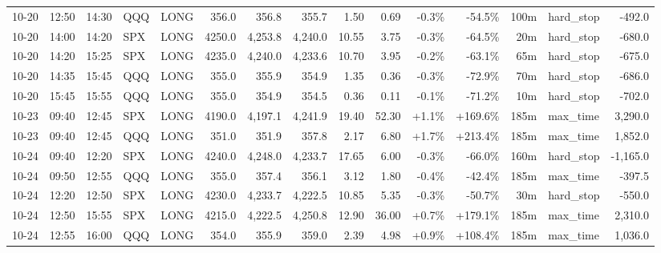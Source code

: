 \documentclass[11pt,a4paper,twoside]{article}
\begin{document}
\begin{landscape}
\begin{center}
\begin{longtable}{>{\color{txtmain}}l l l l l r r r r r r r r >{\color{txtmain}}l r}
10-20 & 12:50 & 14:30 & QQQ & LONG & 356.0 & 356.8 & 355.7 & 1.50 & 0.69 & \textcolor{lossred}{-0.3\%} & \textcolor{lossred}{-54.5\%} & 100m & hard\_stop & \textcolor{lossred}{-492.0} \\
10-20 & 14:00 & 14:20 & SPX & LONG & 4250.0 & 4,253.8 & 4,240.0 & 10.55 & 3.75 & \textcolor{lossred}{-0.3\%} & \textcolor{lossred}{-64.5\%} & 20m & hard\_stop & \textcolor{lossred}{-680.0} \\
10-20 & 14:20 & 15:25 & SPX & LONG & 4235.0 & 4,240.0 & 4,233.6 & 10.70 & 3.95 & \textcolor{lossred}{-0.2\%} & \textcolor{lossred}{-63.1\%} & 65m & hard\_stop & \textcolor{lossred}{-675.0} \\
10-20 & 14:35 & 15:45 & QQQ & LONG & 355.0 & 355.9 & 354.9 & 1.35 & 0.36 & \textcolor{lossred}{-0.3\%} & \textcolor{lossred}{-72.9\%} & 70m & hard\_stop & \textcolor{lossred}{-686.0} \\
10-20 & 15:45 & 15:55 & QQQ & LONG & 355.0 & 354.9 & 354.5 & 0.36 & 0.11 & \textcolor{lossred}{-0.1\%} & \textcolor{lossred}{-71.2\%} & 10m & hard\_stop & \textcolor{lossred}{-702.0} \\
10-23 & 09:40 & 12:45 & SPX & LONG & 4190.0 & 4,197.1 & 4,241.9 & 19.40 & 52.30 & \textcolor{wingreen}{+1.1\%} & \textcolor{wingreen}{+169.6\%} & 185m & max\_time & \textcolor{wingreen}{3,290.0} \\
10-23 & 09:40 & 12:45 & QQQ & LONG & 351.0 & 351.9 & 357.8 & 2.17 & 6.80 & \textcolor{wingreen}{+1.7\%} & \textcolor{wingreen}{+213.4\%} & 185m & max\_time & \textcolor{wingreen}{1,852.0} \\
10-24 & 09:40 & 12:20 & SPX & LONG & 4240.0 & 4,248.0 & 4,233.7 & 17.65 & 6.00 & \textcolor{lossred}{-0.3\%} & \textcolor{lossred}{-66.0\%} & 160m & hard\_stop & \textcolor{lossred}{-1,165.0} \\
10-24 & 09:50 & 12:55 & QQQ & LONG & 355.0 & 357.4 & 356.1 & 3.12 & 1.80 & \textcolor{lossred}{-0.4\%} & \textcolor{lossred}{-42.4\%} & 185m & max\_time & \textcolor{lossred}{-397.5} \\
10-24 & 12:20 & 12:50 & SPX & LONG & 4230.0 & 4,233.7 & 4,222.5 & 10.85 & 5.35 & \textcolor{lossred}{-0.3\%} & \textcolor{lossred}{-50.7\%} & 30m & hard\_stop & \textcolor{lossred}{-550.0} \\
10-24 & 12:50 & 15:55 & SPX & LONG & 4215.0 & 4,222.5 & 4,250.8 & 12.90 & 36.00 & \textcolor{wingreen}{+0.7\%} & \textcolor{wingreen}{+179.1\%} & 185m & max\_time & \textcolor{wingreen}{2,310.0} \\
10-24 & 12:55 & 16:00 & QQQ & LONG & 354.0 & 355.9 & 359.0 & 2.39 & 4.98 & \textcolor{wingreen}{+0.9\%} & \textcolor{wingreen}{+108.4\%} & 185m & max\_time & \textcolor{wingreen}{1,036.0} \\

\end{longtable}
\end{center}
\end{landscape}
\end{document}
